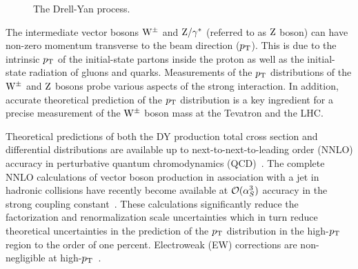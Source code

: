 \begin{figure} %
 \centering
 \caption{The Drell-Yan process.} \label{fig:DYdiagram}
\end{figure}
The intermediate vector bosons $\mathrm{W}^{\pm}$ and $\mathrm{Z}/\gamma^*$ (referred to as 
$\mathrm{Z}$ boson) can have non-zero momentum transverse to the beam direction 
($p_{\mathrm{T}}$). This is due to the intrinsic $p_{\mathrm{T}}$ of the initial-state partons 
inside the proton as well as the initial-state radiation of gluons and quarks. 
Measurements of the $p_{\mathrm{T}}$ distributions of the $\mathrm{W}^{\pm}$ and $\mathrm{Z}$ bosons probe 
various aspects of the strong interaction. In addition, accurate theoretical 
prediction of the $p_{\mathrm{T}}$ distribution is a key ingredient for a precise 
measurement of the $\mathrm{W}^{\pm}$ boson mass at the Tevatron and the LHC.  
      
Theoretical predictions of both the DY production total cross section and 
differential distributions are available up to next-to-next-to-leading order 
(NNLO) accuracy in perturbative quantum chromodynamics 
(QCD)~\cite{Melnikov:2006kv,Catani:2009sm}. The complete NNLO calculations of 
vector boson production in association with a jet in hadronic collisions have 
recently become available at $\mathcal{O}(\alpha_S^3)$ accuracy in the strong 
coupling constant~\cite{Ridder:2015dxa,Boughezal:2015ded,Boughezal:2015dva}. 
These calculations significantly reduce the factorization and renormalization scale 
uncertainties which in turn reduce theoretical uncertainties in the prediction 
of the $p_{\mathrm{T}}$ distribution in the high-$p_{\mathrm{T}}$ region to the order of one 
percent. Electroweak (EW) corrections are non-negligible at 
high-$p_{\mathrm{T}}$~\cite{Dittmaier:2014qza,Lindert:2017olm}.      

